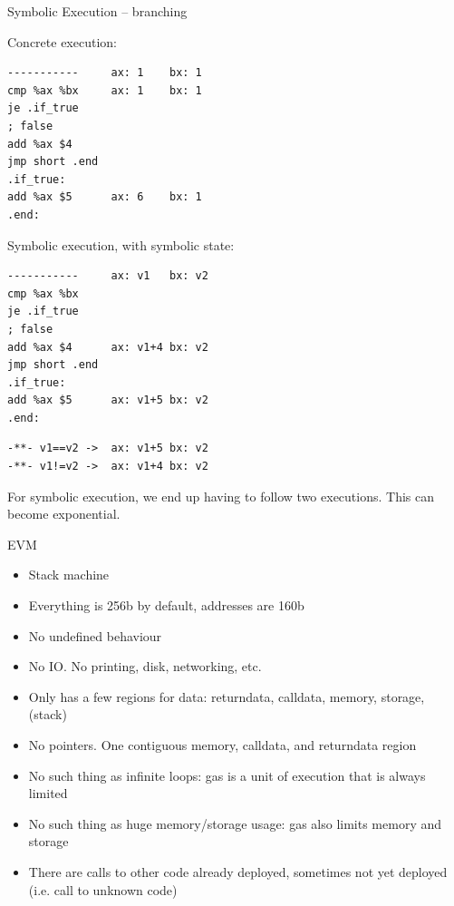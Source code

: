 \documentclass[aspectratio=169]{beamer}
\begin{document}
\begin{frame}[fragile=singleslide]{Symbolic Execution -- branching}
\begin{minipage}[t]{0.45\textwidth}
Concrete execution:
\begin{Verbatim}[fontsize=\small]
-----------     ax: 1    bx: 1
cmp %ax %bx     ax: 1    bx: 1
je .if_true     
; false
add %ax $4
jmp short .end
.if_true:
add %ax $5      ax: 6    bx: 1
.end:
\end{Verbatim}
\end{minipage}%
\begin{minipage}[t]{0.45\textwidth}
Symbolic execution, with symbolic state:
\begin{Verbatim}[fontsize=\small]
-----------     ax: v1   bx: v2
cmp %ax %bx     
je .if_true     
; false
add %ax $4      ax: v1+4 bx: v2
jmp short .end
.if_true:
add %ax $5      ax: v1+5 bx: v2
.end:
\end{Verbatim}
\begin{Verbatim}[fontsize=\small]
-**- v1==v2 ->  ax: v1+5 bx: v2
-**- v1!=v2 ->  ax: v1+4 bx: v2
\end{Verbatim}
\end{minipage}
\bigskip

For symbolic execution, we end up having to follow two executions. This can become exponential.
\end{frame}


\begin{frame}[fragile=singleslide]{EVM}
\begin{itemize}
    \item Stack machine
    \item Everything is 256b by default, addresses are 160b
    \item No undefined behaviour
    \item No IO. No printing, disk, networking, etc.
    \item Only has a few regions for data: returndata, calldata, memory, storage, (stack)
    \item No pointers. One contiguous memory, calldata, and returndata region
    \item No such thing as infinite loops: gas is a unit of execution that is always limited
    \item No such thing as huge memory/storage usage: gas also limits memory and storage
    \item There are calls to other code already deployed, sometimes not yet deployed (i.e. call to unknown code)
\end{itemize}
\end{frame}
\end{document}

